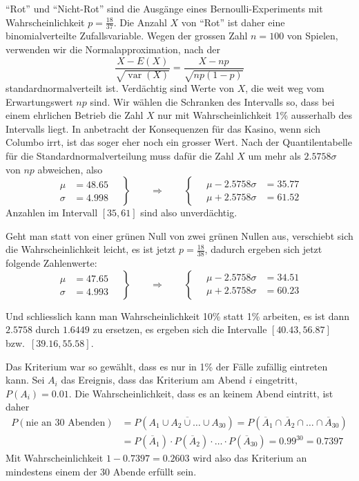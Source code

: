 \begin{loesung}
\begin{teilaufgaben}
\item
``Rot'' und ``Nicht-Rot'' sind die Ausgänge eines Bernoulli-Experiments mit
Wahrscheinlichkeit $p=\frac{18}{37}$. Die Anzahl $X$ von ``Rot'' ist daher
eine binomialverteilte Zufallsvariable. Wegen der grossen Zahl $n=100$
von Spielen, verwenden wir die Normalapproximation, nach der 
\[
\frac{X-E(X)}{\sqrt{\operatorname{var}(X)}}=\frac{X-np}{\sqrt{np(1-p)}}
\]
standardnormalverteilt ist. Verdächtig sind Werte von $X$, die weit
weg vom Erwartungswert $np$ sind. Wir wählen die Schranken des Intervalls
so, dass bei einem ehrlichen Betrieb die Zahl $X$ nur mit Wahrscheinlichkeit
1\% ausserhalb des Intervalls liegt. In anbetracht der Konsequenzen
für das Kasino, wenn sich Columbo irrt, ist das soger eher noch ein
grosser Wert. Nach der Quantilentabelle für die
Standardnormalverteilung muss dafür die Zahl $X$ um mehr als $2.5758\sigma$
von $np$ abweichen, also
\[
\left.
\begin{aligned}
\mu&=48.65\\
\sigma&=4.998
\end{aligned}
\quad
\right\}
\qquad
\Rightarrow
\qquad
\left\{\quad
\begin{aligned}
\mu - 2.5758\sigma&=35.77\\
\mu + 2.5758\sigma&=61.52
\end{aligned}
\right.
\]
Anzahlen im Intervall $[35,61]$ sind also unverdächtig.

Geht man statt von einer grünen Null von zwei grünen Nullen aus, verschiebt
sich die Wahrscheinlichkeit leicht, es ist jetzt $p=\frac{18}{38}$, dadurch
ergeben sich jetzt folgende Zahlenwerte:
\[
\left.
\begin{aligned}
\mu&=47.65\\
\sigma&=4.993
\end{aligned}
\quad
\right\}
\qquad
\Rightarrow
\qquad
\left\{\quad
\begin{aligned}
\mu - 2.5758\sigma&=34.51\\
\mu + 2.5758\sigma&=60.23
\end{aligned}
\right.
\]

Und schliesslich kann man Wahrscheinlichkeit 10\% statt 1\% arbeiten, 
es ist dann $2.5758$ durch $1.6449$ zu ersetzen, es ergeben sich
die Intervalle $[40.43, 56.87]$ bzw.~$[39.16, 55.58]$.
\item
Das Kriterium war so gewählt, dass es nur in 1\% der Fälle zufällig
eintreten kann. Sei $A_i$ das Ereignis, dass das Kriterium am Abend $i$
eingetritt, $P(A_i)=0.01$.
Die Wahrscheinlichkeit, dass es an keinem Abend eintritt,
ist daher 
\begin{align*}
P(\text{nie an 30 Abenden})&=P(\overline{A_1\cup A_2\cup\dots\cup A_{30}})
=P(
\overline{A}_1
\cap
\overline{A}_2
\cap
\dots
\cap
\overline{A}_{30}
)
\\
&=
P(\overline{A}_1)
\cdot
P(\overline{A}_2)
\cdot
\dots
\cdot
P(\overline{A}_{30})
=0.99^{30}=0.7397
\end{align*}
Mit Wahrscheinlichkeit $1-0.7397=0.2603$ wird also das Kriterium an mindestens
einem der 30 Abende erfüllt sein.


\end{teilaufgaben}
\end{loesung}
